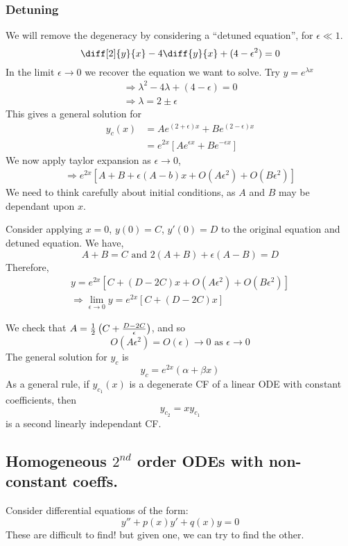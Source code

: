 \documentclass{article}
\begin{document}
\subsubsection*{Detuning}
We will remove the degeneracy by considering a ``detuned equation'', for $\epsilon \ll 1$.
\[
    \diff[2]{y}{x} - 4 \diff{y}{x} + (4 - \epsilon^2) = 0 
\]
In the limit $\epsilon \rightarrow 0$ we recover the equation we want to solve.
Try $y = e^{\lambda x}$
\begin{align*}
    \Rightarrow \lambda^2 - 4 \lambda + (4 - \epsilon) = 0 \\
    \Rightarrow \lambda = 2 \pm \epsilon
\end{align*}
This gives a general solution for
\begin{align*}
    y_c(x) &= A e^{(2 + \epsilon) x} + B e^{(2 - \epsilon) x} \\
    &= e^{2x}[Ae^{\epsilon x} + Be^{-\epsilon x}]
\end{align*}
We now apply taylor expansion as $\epsilon \rightarrow 0$,
\begin{align*}
    \Rightarrow e^{2x}[A + B + \epsilon (A - b) x + O(A \epsilon^2) + O(B \epsilon^2)]
\end{align*}
We need to think carefully about initial conditions, as $A$ and $B$ may be dependant upon $x$.

Consider applying $x = 0$, $y(0) = C$, $y'(0) = D$ to the original equation and detuned equation. We have,
\[
    A + B = C \text{ and } 2(A + B) + \epsilon(A - B) = D
\]
Therefore,
\begin{align*}
    y = e^{2x}[C + (D - 2C) x + O(A \epsilon^2) + O(B \epsilon^2)] \\
    \Rightarrow \lim_{\epsilon \rightarrow 0} y = e^{2x}[C + (D - 2C)x]
\end{align*}

We check that $A = \frac{1}{2} \left( C + \frac{D - 2C}{\epsilon} \right)$, and so
\[
    O(A \epsilon^2) = O(\epsilon) \rightarrow 0 \text{ as } \epsilon \rightarrow 0
\]
The general solution for $y_c$ is
\[
    y_c = e^{2x}(\alpha + \beta x)
\]
As a general rule, if $y_{c_1}(x)$ is a degenerate CF of a linear ODE with constant coefficients, then
\[
    y_{c_2} = x y_{c_1}
\]
is a second linearly independant CF.

\subsection{Homogeneous $2^{nd}$ order ODEs with non-constant coeffs.}
Consider differential equations of the form:
\[
    y'' + p(x)y' + q(x)y = 0 \tag{$\star$}
\]
These are difficult to find! but given one, we can try to find the other.
\end{document}
